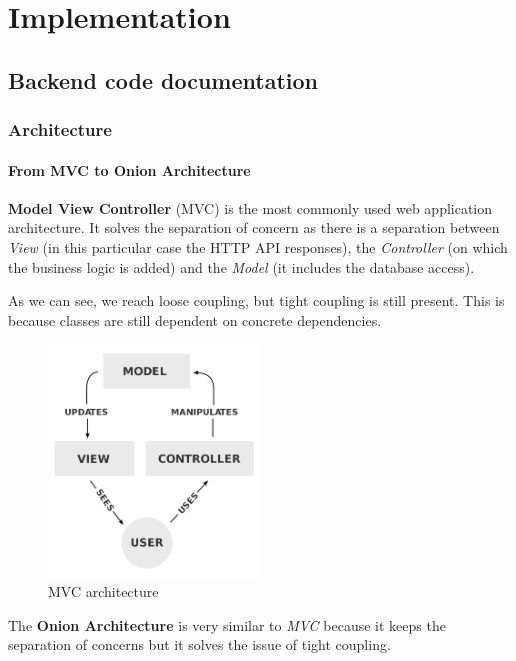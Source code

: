 \chapter{Implementation}

\section{Backend code documentation}
    \subsection{Architecture}
        \subsubsection{From MVC to Onion Architecture}
            \textbf{Model View Controller} (MVC) is the most commonly used web application architecture. It solves the separation of concern as there is a separation between \textit{View} (in this particular case the HTTP API responses), the \textit{Controller} (on which the business logic is added) and the \textit{Model} (it includes the database access).

            As we can see, we reach loose coupling, but tight coupling is still present. This is because classes are still dependent on concrete dependencies. \\

            \begin{figure}[H]
                \centering
                    \includegraphics[width=0.5\textwidth]{assets/mvc.png}
                \caption{MVC architecture \cite{MVC}}
                \label{fig:implementation_mvc}
            \end{figure}

            The \textbf{Onion Architecture} is very similar to \textit{MVC} because it keeps the separation of concerns but it solves the issue of tight coupling.

